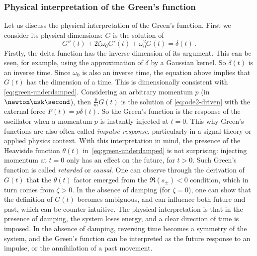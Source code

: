\subsubsection{Physical interpretation of the Green's function}
Let us discuss the physical interpretation of the Green's function. First we consider its
physical dimensions: $G$ is the solution of
\begin{equation}
  G''(t)+2\zeta\omega_0 G'(t)+\omega_0^2G(t)=\delta(t)\,.
\end{equation}
Firstly, the delta function has the inverse dimension of its argument. This can be seen,
for example, using the approximation of $\delta$ by a Gaussian kernel. So $\delta(t)$ is
an inverse time. Since $\omega_0$ is also an inverse time, the equation above implies that
$G(t)$ has the dimension of a time. This is dimensionally consistent with
\cref{eq:green-underdamped}. Considering an arbitrary momentum $p$ (in
$\newton\usk\second$), then $\frac{p}{m}G(t)$ is the solution of \cref{eq:ode2-driven}
with the external force $F(t)=p\delta(t)$. So the Green's function is the response of the
oscillator when a momentum $p$ is instantly injected at $t=0$. This why Green's functions
are also often called \emph{impulse response}, particularly in a signal theory or applied
physics context. With this interpretation in mind, the presence of the Heaviside function
$\theta(t)$ in~\cref{eq:green-underdamped} is not surprising: injecting momentum at $t=0$
only has an effect on the future, \ie for $t>0$. Such Green's function is called
\emph{retarded} or \emph{causal}. One can observe through the derivation of $G(t)$ that
the $\theta(t)$ factor emerged from the $\Re(s_{\pm})<0$ condition, which in turn comes
from $\zeta>0$. In the absence of damping (\ie for $\zeta=0$), one can show that the
definition of $G(t)$ becomes ambiguous, and can influence both future and past, which can
be counter-intuitive. The physical interpretation is that in the presence of damping, the
system loses energy, and a clear direction of time is imposed. In the absence of damping,
reversing time becomes a symmetry of the system, and the Green's function can be
interpreted as the future response to an impulse, or the annihilation of a past movement.

